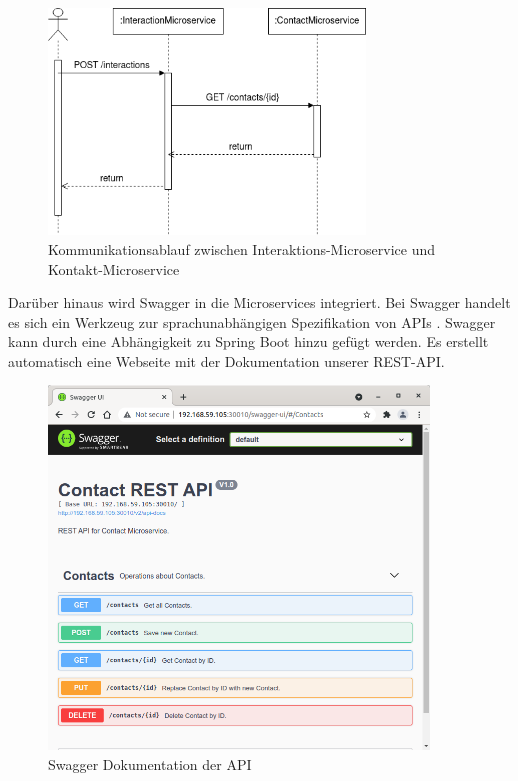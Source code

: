 \begin{figure}[H] 
    \centering
    \includegraphics[width=0.75\textwidth]{figures/UMLSequenzdiagramm.png}
    \caption{Kommunikationsablauf zwischen Interaktions-Microservice und Kontakt-Microservice}
\end{figure}

Darüber hinaus wird Swagger in die Microservices integriert. Bei Swagger handelt es sich ein Werkzeug zur sprachunabhängigen Spezifikation von APIs \parencite[vgl.][]{smartbearsoftwareSwagger2022}. Swagger kann durch eine Abhängigkeit zu Spring Boot hinzu gefügt werden. Es erstellt automatisch eine Webseite mit der Dokumentation unserer \ac{REST}-\ac{API}. 

\begin{figure}[H] 
    \centering
    \includegraphics[width=0.9\textwidth]{figures/KontaktAPISwagger.png}
    \caption{Swagger Dokumentation der API}
\end{figure}

